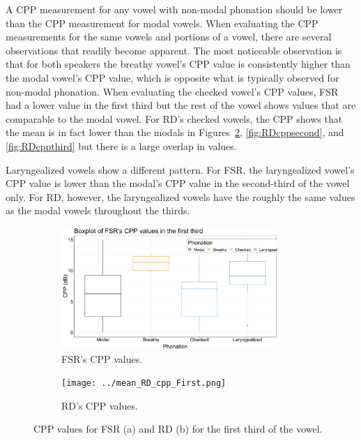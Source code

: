 \documentclass[12pt, letterpaper]{article}
\begin{document}
A CPP measurement for any vowel with non-modal phonation should be lower than the CPP measurement for modal vowels. When evaluating the CPP measurements for the same vowels and portions of a vowel, there are several observations that readily become apparent. The most noticeable observation is that for both speakers the breathy vowel's CPP value is consistently higher than the modal vowel's CPP value, which is opposite what is typically observed for non-modal phonation. When evaluating the checked vowel's CPP values, FSR had a lower value in the first third but the rest of the vowel shows values that are comparable to the modal vowel. For RD's checked vowels, the CPP shows that the mean is in fact lower than the modals in Figures~\ref{fig:RDcppfirst}, \ref{fig:RDcppsecond}, and \ref{fig:RDcppthird} but there is a large overlap in values. 

Laryngealized vowels show a different pattern. For FSR, the laryngealized vowel's CPP value is lower than the modal's CPP value in the second-third of the vowel only. For RD, however, the laryngealized vowels have the roughly the same values as the modal vowels throughout the thirds. 

\begin{figure}[!ht]
	\centering
	\begin{subfigure}{.5\textwidth}
		\centering
		\includegraphics[width=0.9\textwidth]{../mean_FSR_cpp_First.png}
		\caption{FSR's CPP values.}
		\label{fig:FSRcppfirst} 
	\end{subfigure}%
	\begin{subfigure}{.5\textwidth}
		\centering
		\texttt{[image: ../mean\_RD\_cpp\_First.png]}
		\caption{RD's CPP values.}
		\label{fig:RDcppfirst} 
	\end{subfigure}
	\caption{CPP values for FSR (a) and RD (b) for the first third of the vowel. }
	\label{fig:cppfirst}
\end{figure}
\end{document}
